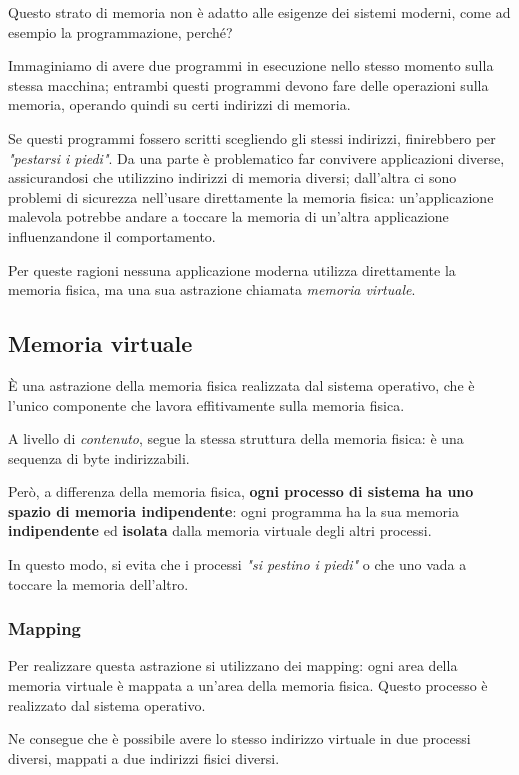 Questo strato di memoria non è adatto alle esigenze dei sistemi moderni, come
ad esempio la programmazione, perché?

Immaginiamo di avere due programmi in esecuzione nello stesso momento sulla stessa macchina;
entrambi questi programmi devono fare delle operazioni sulla memoria, operando quindi su certi indirizzi di memoria.

Se questi programmi fossero scritti scegliendo gli stessi indirizzi, finirebbero per \textit{"pestarsi i piedi"}.
Da una parte è problematico far convivere applicazioni diverse, assicurandosi che utilizzino indirizzi di memoria diversi;
dall'altra ci sono problemi di sicurezza nell'usare direttamente la memoria fisica: un'applicazione
malevola potrebbe andare a toccare la memoria di un'altra applicazione
influenzandone il comportamento.

Per queste ragioni nessuna applicazione moderna utilizza direttamente la memoria fisica, ma una 
sua astrazione chiamata \textit{memoria virtuale}.

\subsection{Memoria virtuale}

È una astrazione della memoria fisica realizzata dal sistema operativo, che è l'unico componente
che lavora effitivamente sulla memoria fisica.

A livello di \textit{contenuto}, segue la stessa struttura della memoria fisica: è una sequenza di byte indirizzabili.

Però, a differenza della memoria fisica, \textbf{ogni processo di sistema ha uno spazio di memoria indipendente}: ogni programma ha la sua memoria
\textbf{indipendente} ed \textbf{isolata} dalla memoria virtuale degli altri processi.

In questo modo, si evita che i processi \textit{"si pestino i piedi"} o che uno vada a toccare la 
memoria dell'altro.

\subsubsection{Mapping}

Per realizzare questa astrazione si utilizzano dei mapping: ogni area della memoria virtuale è 
mappata a un'area della memoria fisica. Questo processo è realizzato dal sistema operativo.

Ne consegue che è possibile avere lo stesso indirizzo virtuale in due processi diversi, mappati a due indirizzi fisici diversi.

